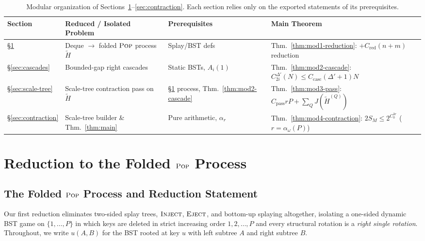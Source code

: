 \documentclass[11pt]{article}
\theoremstyle{definition}
\theoremstyle{remark}
\newcommand{\POP}{\textnormal{\scshape Pop}}
\newcommand{\INJECT}{\textnormal{\scshape Inject}}
\newcommand{\EJECT}{\textnormal{\scshape Eject}}
\begin{document}
\begin{table}[ht]
\centering
\footnotesize
\begin{tabular}{@{}llll@{}}
\toprule
\textbf{Section} & \textbf{Reduced / Isolated Problem} & \textbf{Prerequisites} & \textbf{Main Theorem} \\
\midrule
\S\ref{sec:reduction} & Deque $\to$ folded $\POP$ process $\widetilde{H}$ & Splay/BST defs & Thm.~\ref{thm:mod1-reduction}: $+C_{\mathrm{red}}(n+m)$ reduction \\
\S\ref{sec:cascades} & Bounded-gap right cascades & Static BSTs, $A_i(1)$ & Thm.~\ref{thm:mod2-cascade}: $C^{\Delta'}_{2i}(N) \le C_{\mathrm{casc}}(\Delta'+1)N$ \\
\S\ref{sec:scale-tree} & Scale-tree contraction pass on $\widetilde{H}$ & \S\ref{sec:reduction} process, Thm.~\ref{thm:mod2-cascade} & Thm.~\ref{thm:mod3-pass}: $C_{\mathrm{pass}} r P + \sum_Q J(\widetilde{H}^{(Q)})$ \\
\addlinespace[2pt]
\S\ref{sec:contraction} & Scale-tree builder \& Thm.~\ref{thm:main} & Pure arithmetic, $\alpha_r$ & Thm.~\ref{thm:mod4-contraction}: $2S_M \le 2^{C_0^{3r}}$ ($r = \alpha_\omega(P)$) \\
\bottomrule
\end{tabular}
\caption{Modular organization of Sections~\ref{sec:reduction}--\ref{sec:contraction}. Each section relies only on the exported statements of its prerequisites.}
\label{tab:modules}
\end{table}
\section{Reduction to the Folded \texorpdfstring{$\POP$}{Pop} Process}
\label{sec:reduction}

\subsection{The Folded \texorpdfstring{$\POP$}{Pop} Process and Reduction Statement}
\label{subsec:overview-mod1}

Our first reduction eliminates two-sided splay trees, $\INJECT$, $\EJECT$, and bottom-up splaying altogether, isolating a one-sided dynamic BST game on $\{1, \dots, P\}$ in which keys are deleted in strict increasing order $1, 2, \dots, P$ and every structural rotation is a \emph{right single rotation}. Throughout, we write $u(A, B)$ for the BST rooted at key $u$ with left subtree $A$ and right subtree $B$.
\end{document}
